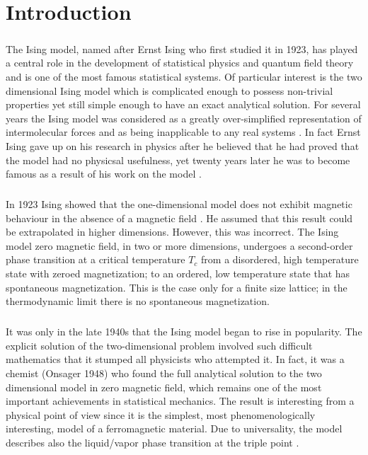 \documentclass[12pt] {report} %
\begin{document}
	\chapter{Introduction}
	 
	
		\paragraph{}
			The Ising model, named after Ernst Ising who first studied it in 1923, has played a central role in the development of statistical physics and quantum field theory \cite{anagnostopoulos} and is one of the most famous statistical systems. Of particular interest is the two dimensional Ising model which is complicated enough to possess non-trivial properties yet still simple enough to have an exact analytical solution. For several years the Ising model was considered as a greatly over-simplified representation of intermolecular forces and as being inapplicable to any real systems \cite{history}. In fact Ernst Ising gave up on his research in physics after he believed that he had proved that the model had no physicsal usefulness, yet twenty years later he was to become famous as a result of his work on the model \cite{history}.
		\paragraph{}
			In 1923 Ising showed that the one-dimensional model does  not exhibit magnetic behaviour in the absence of a magnetic field \cite{blair}. He assumed that this result could be extrapolated in higher dimensions. However, this was incorrect. The Ising model zero magnetic field, in two or more dimensions, undergoes a second-order phase transition at a critical temperature $T_c$ from a disordered, high temperature state with zeroed magnetization; to an ordered, low temperature state that has spontaneous magnetization. This is the case only for a finite size lattice; in the thermodynamic limit there is no spontaneous magnetization.
		\paragraph{}
			It was only in the late 1940s that the Ising model began to rise in popularity. The explicit solution of the two-dimensional problem involved such difficult mathematics that it stumped all physicists who attempted it. In fact, it was a chemist (Onsager 1948) who found the full analytical solution to the two dimensional model in zero magnetic field,  which remains one of the most important achievements in statistical mechanics. The result is interesting from a physical point of view since it is the simplest, most phenomenologically interesting, model of a ferromagnetic material. Due to universality, the model describes also the liquid/vapor phase transition at the triple point \cite{anagnostopoulos}. 
\end{document}
